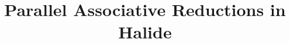 \documentclass[10pt]{main}
\begin{document}


\title{Parallel Associative Reductions in Halide}

\end{document}
